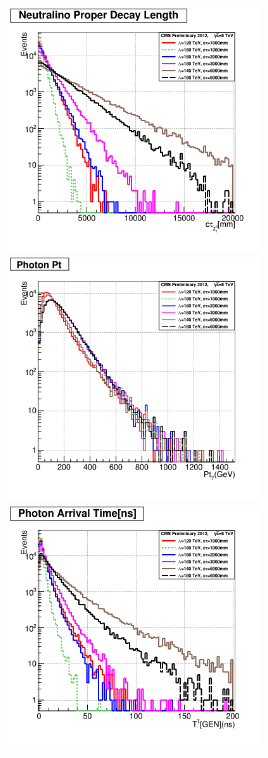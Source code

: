{{\begin{center}
{\includegraphics[height=0.5\textwidth,width=0.5\textwidth]{THESISPLOTS/GMSB-SPS8-MODEL-Neutralino-Proper-DecayLength.png}} \\
\hspace{0.5cm}
\mbox{\includegraphics[height=0.5\textwidth,width=0.5\textwidth]{THESISPLOTS/GMSB-SPS8-MODEL-Photon-Pt.png} \hspace{-1cm}
\includegraphics[height=0.5\textwidth,width=0.5\textwidth]{THESISPLOTS/GMSB-SPS8-MODEL-Photon-Arrival-Time.png}}
\label{fig:NKINE}
\end{center}



}}
